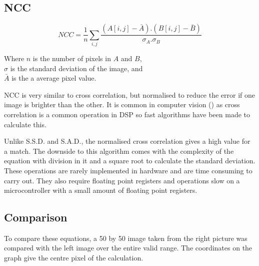 \subsection{NCC}
\begin{equation}\label{eq:NCC}
NCC =  \frac{1}{n}\sum\limits_{i,j} \frac{(A[i,j] - \bar{A}).(B[i,j] - \bar{B})}{\sigma _A . \sigma _B}
\end{equation}
\begin{center}
Where $n$ is the number of pixels in $A$ and $B$, \\$\sigma$ is the standard deviation of the image, and \\$\bar{A}$ is the a average pixel value. 
\end{center}
NCC is very similar to cross correlation, but normalised to reduce the error if one image is brighter than the other. It is common in computer vision (\cite{Tsai:NCC}) as cross correlation is a common operation in DSP so fast algorithms have been made to calculate this. 

Unlike S.S.D. and S.A.D., the normalised cross correlation gives a high value for a match. The downside to this algorithm comes with the complexity of the equation with division in it and a square root to calculate the standard deviation. These operations are rarely implemented in hardware and are time consuming to carry out. They also require floating point registers and operations slow on a microcontroller with a small amount of floating point registers. 



\subsection{Comparison}

To compare these equations, a 50 by 50 image taken from the right picture was compared with the left image over the entire valid range. The coordinates on the graph give the centre pixel of the calculation. 

